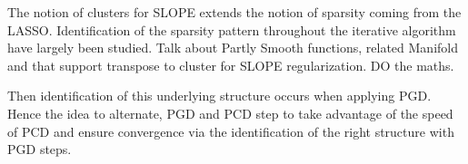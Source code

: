 The notion of clusters for SLOPE extends the notion of sparsity coming from the LASSO.
Identification of the sparsity pattern throughout the iterative algorithm have largely been studied.
Talk about Partly Smooth functions, related Manifold and that support transpose to cluster for SLOPE regularization. DO the maths.

Then identification of this underlying structure occurs when applying PGD.
Hence the idea to alternate, PGD and PCD step to take advantage of the speed of PCD and ensure convergence via the identification of the right structure with PGD steps.

\begin{algorithm}[tb]
  \caption{%
    Hybrid coordinate descent and proximal gradient descent algorithm
    for SLOPE\label{alg:hybrid}}


  \Return{\(\beta\)}
\end{algorithm}


